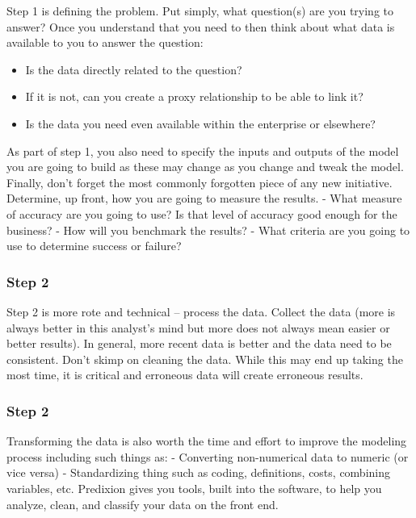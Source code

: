 \documentclass[PredictiveAnalytics101.tex]{subfiles}
\begin{document}
\begin{frame}
Step 1 is defining the problem. Put simply, what question(s) are you trying to answer? Once you
understand that you need to then think about what data is available to you to answer the question:

\begin{itemize}
\item Is the data directly related to the question?
\item If it is not, can you create a proxy relationship to be able to link it?
\item Is the data you need even available within the enterprise or elsewhere?
\end{itemize}

\end{frame}
\begin{frame}
As part of step 1, you also need to specify the inputs and outputs of the model you are going to build as
these may change as you change and tweak the model. Finally, don’t forget the most commonly
forgotten piece of any new initiative. Determine, up front, how you are going to measure the results.
- What measure of accuracy are you going to use? Is that level of accuracy good enough for
the business?
- How will you benchmark the results?
- What criteria are you going to use to determine success or failure?
\end{frame}
\begin{frame}
	\frametitle{Step 2}
Step 2 is more rote and technical – process the data. Collect the data (more is always better in this
analyst’s mind but more does not always mean easier or better results). In general, more recent data is
better and the data need to be consistent. Don’t skimp on cleaning the data. While this may end up
taking the most time, it is critical and erroneous data will create erroneous results.
\end{frame}
\begin{frame}
	\frametitle{Step 2}
Transforming the
data is also worth the time and effort to improve the modeling process including such things as:
- Converting non-numerical data to numeric (or vice versa)
- Standardizing thing such as coding, definitions, costs, combining variables, etc.
Predixion gives you tools, built into the software, to help you analyze, clean, and classify your data on
the front end.
\end{frame}
\end{document}
